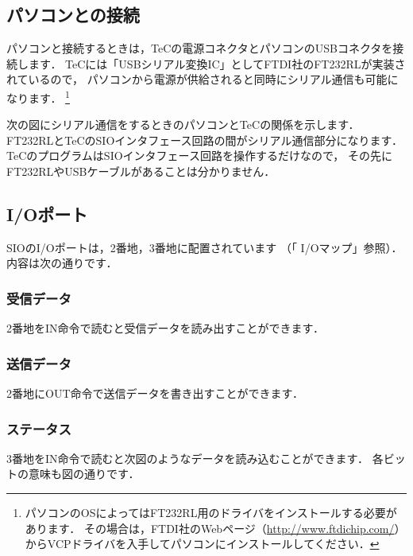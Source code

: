 \begin{center}
\end{center}

\subsection{パソコンとの接続}
パソコンと接続するときは，TeCの電源コネクタとパソコンのUSBコネクタを接続します．
TeCには「USBシリアル変換IC」としてFTDI社のFT232RLが実装されているので，
パソコンから電源が供給されると同時にシリアル通信も可能になります．
\footnote{パソコンのOSによってはFT232RL用のドライバをインストールする必要があります．
その場合は，FTDI社のWebページ（\url{http://www.ftdichip.com/}）
からVCPドライバを入手してパソコンにインストールしてください．}

次の図にシリアル通信をするときのパソコンとTeCの関係を示します．
FT232RLとTeCのSIOインタフェース回路の間がシリアル通信部分になります．
TeCのプログラムはSIOインタフェース回路を操作するだけなので，
その先にFT232RLやUSBケーブルがあることは分かりません．

\begin{center}
\end{center}

\subsection{I/Oポート}
\label{sioport}

SIOのI/Oポートは，2番地，3番地に配置されています
（「 I/Oマップ」参照）．
内容は次の通りです．

\subsubsection{受信データ}
2番地をIN命令で読むと受信データを読み出すことができます．

\subsubsection{送信データ}
2番地にOUT命令で送信データを書き出すことができます．

\subsubsection{ステータス}
3番地をIN命令で読むと次図のようなデータを読み込むことができます．
各ビットの意味も図の通りです．

